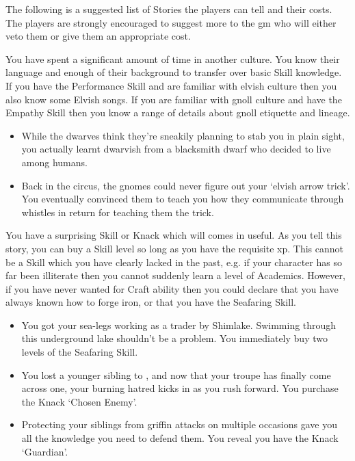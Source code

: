\begin{multicols}{2}

\noindent
The following is a suggested list of Stories the players can tell and their costs.
The players are strongly encouraged to suggest more to the \gls{gm} who will either veto them or give them an appropriate cost.

You have spent a significant amount of time in another culture. You know their language and enough of their background to transfer over basic Skill knowledge. If you have the Performance Skill and are familiar with elvish culture then you also know some Elvish songs.
If you are familiar with gnoll culture and have the Empathy Skill then you know a range of details about gnoll etiquette and lineage.

\begin{itemize}
\item While the dwarves think they're sneakily planning to stab you in plain sight, you actually learnt dwarvish from a blacksmith dwarf who decided to live among humans.
\item Back in the circus, the gnomes could never figure out your `elvish arrow trick'.
You eventually convinced them to teach you how they communicate through whistles in return for teaching them the trick.
\end{itemize}

\label{surpriseSkill}
You have a surprising Skill or Knack which will comes in useful.
As you tell this story, you can buy a Skill level so long as you have the requisite \gls{xp}.
This cannot be a Skill which you have clearly lacked in the past, e.g. if your character has so far been illiterate then you cannot suddenly learn a level of Academics.
However, if you have never wanted for Craft ability then you could declare that you have always known how to forge iron, or that you have the Seafaring Skill.

\begin{itemize}
  \item
  You got your sea-legs working as a trader by Shimlake.
  Swimming through this underground lake shouldn't be a problem.
  You immediately buy two levels of the Seafaring Skill.
  \item
  You lost a younger sibling to , and now that your troupe has finally come across one, your burning hatred kicks in as you rush forward.
  You purchase the Knack `Chosen Enemy'.
  \item
  Protecting your siblings from griffin attacks on multiple occasions gave you all the knowledge you need to defend them.
  You reveal you have the Knack `Guardian'.
\end{itemize}


\end{multicols}
